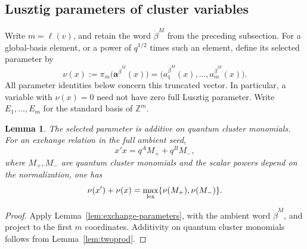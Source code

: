 \documentclass[12pt, reqno]{amsart}
\theoremstyle{plain}
\newtheorem{lemma}[theorem]{Lemma}
\theoremstyle{definition}
\numberwithin{equation}{section}
\begin{document}
\subsection{Lusztig parameters of cluster variables}

Write \(m=\ell(v)\), and retain the word \(\dot\beta^M\) from the
preceding subsection. For a global-basis element, or a power of
\(q^{1/2}\) times such an element, define its selected parameter by
\begin{equation}\label{eq:selected-parameter}
 \nu(x):=\pi_m\bigl(\mathbf a^{\dot\beta^M}(x)\bigr)
 =\bigl(a_1^{\dot\beta^M}(x),\ldots,a_m^{\dot\beta^M}(x)\bigr).
\end{equation}
All parameter identities below concern this truncated vector. In
particular, a variable with \(\nu(x)=0\) need not have zero full
Lusztig parameter. Write \(E_1,\ldots,E_m\) for the standard basis
of \(\mathbb Z^m\).

\begin{lemma}\label{lem:selected-exchange}
The selected parameter is additive on quantum cluster monomials.
For an exchange relation in the full ambient seed,
\[
 x'x=q^A M_+ +q^B M_-,
\]
where \(M_+,M_-\) are quantum cluster monomials and the scalar
powers depend on the normalization, one has
\begin{equation}\label{eq:selected-exchange}
 \nu(x')+\nu(x)
 =\max_{\rm lex}\{\nu(M_+),\nu(M_-)\}.
\end{equation}
\end{lemma}

\begin{proof}
Apply Lemma~\ref{lem:exchange-parameters}, with the ambient word
\(\dot\beta^M\), and project to the first \(m\) coordinates.
Additivity on quantum cluster monomials follows from
Lemma~\ref{lem:twoprod}.
\end{proof}
\end{document}
